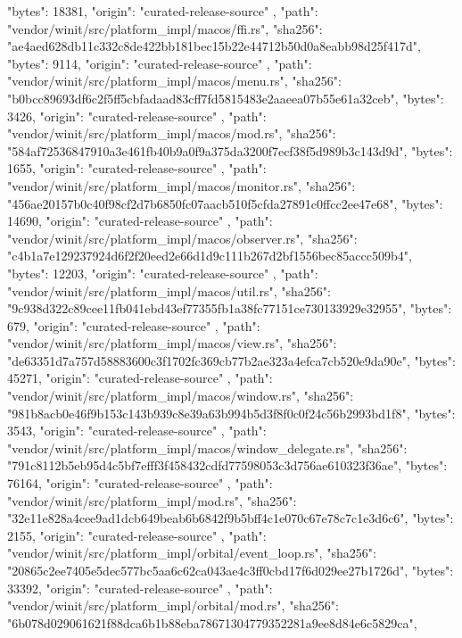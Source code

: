 {{      "bytes": 18381,
      "origin": "curated-release-source"
    },
    {
      "path": "vendor/winit/src/platform_impl/macos/ffi.rs",
      "sha256": "ae4aed628db11c332c8de422bb181bec15b22e44712b50d0a8eabb98d25f417d",
      "bytes": 9114,
      "origin": "curated-release-source"
    },
    {
      "path": "vendor/winit/src/platform_impl/macos/menu.rs",
      "sha256": "b0bcc89693df6c2f5ff5cbfadaad83cff7fd5815483e2aaeea07b55e61a32ceb",
      "bytes": 3426,
      "origin": "curated-release-source"
    },
    {
      "path": "vendor/winit/src/platform_impl/macos/mod.rs",
      "sha256": "584af72536847910a3e461fb40b9a0f9a375da3200f7ecf38f5d989b3c143d9d",
      "bytes": 1655,
      "origin": "curated-release-source"
    },
    {
      "path": "vendor/winit/src/platform_impl/macos/monitor.rs",
      "sha256": "456ae20157b0c40f98cf2d7b6850fc07aacb510f5cfda27891c0ffcc2ee47e68",
      "bytes": 14690,
      "origin": "curated-release-source"
    },
    {
      "path": "vendor/winit/src/platform_impl/macos/observer.rs",
      "sha256": "c4b1a7e129237924d6f2f20eed2e66d1d9c111b267d2bf1556bec85accc509b4",
      "bytes": 12203,
      "origin": "curated-release-source"
    },
    {
      "path": "vendor/winit/src/platform_impl/macos/util.rs",
      "sha256": "9c938d322c89cee11fb041ebd43ef77355fb1a38fc77151ce730133929e32955",
      "bytes": 679,
      "origin": "curated-release-source"
    },
    {
      "path": "vendor/winit/src/platform_impl/macos/view.rs",
      "sha256": "de63351d7a757d58883600c3f1702fc369cb77b2ae323a4efca7cb520e9da90e",
      "bytes": 45271,
      "origin": "curated-release-source"
    },
    {
      "path": "vendor/winit/src/platform_impl/macos/window.rs",
      "sha256": "981b8acb0e46f9b153c143b939c8e39a63b994b5d3f8f0c0f24c56b2993bd1f8",
      "bytes": 3543,
      "origin": "curated-release-source"
    },
    {
      "path": "vendor/winit/src/platform_impl/macos/window_delegate.rs",
      "sha256": "791c8112b5eb95d4c5bf7efff3f458432cdfd77598053c3d756ae610323f36ae",
      "bytes": 76164,
      "origin": "curated-release-source"
    },
    {
      "path": "vendor/winit/src/platform_impl/mod.rs",
      "sha256": "32e11e828a4cee9ad1dcb649beab6b6842f9b5bff4c1e070c67e78c7c1e3d6c6",
      "bytes": 2155,
      "origin": "curated-release-source"
    },
    {
      "path": "vendor/winit/src/platform_impl/orbital/event_loop.rs",
      "sha256": "20865c2ee7405e5dec577bc5aa6c62ca043ae4c3ff0cbd17f6d029ee27b1726d",
      "bytes": 33392,
      "origin": "curated-release-source"
    },
    {
      "path": "vendor/winit/src/platform_impl/orbital/mod.rs",
      "sha256": "6b078d029061621f88dca6b1b88eba78671304779352281a9ee8d84e6c5829ca",
}}
